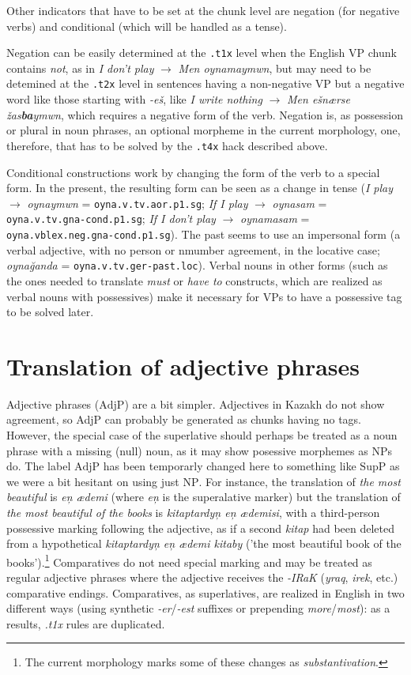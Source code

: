 \documentclass{article}
\begin{document}
Other indicators that have to be set at the chunk level are negation
(for negative verbs) and conditional (which will be handled as a
tense).

Negation can be easily determined at the \texttt{.t1x} level when the
English VP chunk contains \emph{not}, as in \emph{I don't play}
\(\to\) \emph{Men oynamaymwn}, but may need to be detemined at the
\texttt{.t2x} level in sentences having a non-negative VP but a
negative word like those starting with \emph{-eš}, like \emph{I write
  nothing} \(\to\) \emph{Men ešnærse \v{z}as\textbf{ba}ymwn}, which
requires a negative form of the verb. Negation is, as possession or
plural in noun phrases, an optional morpheme in the current
morphology, one, therefore, that has to be solved by the \texttt{.t4x}
hack described above.

Conditional constructions work by changing the form of the verb to a
special form. In the present, the resulting form can be seen as a
change in tense (\emph{I play} \(\to\) \emph{oynaymwn} =
\texttt{oyna.v.tv.aor.p1.sg}; \emph{If I play} \(\to\) \emph{oynasam}
= \texttt{oyna.v.tv.gna-cond.p1.sg}; \emph{If I don't play} \(\to\)
\emph{oynamasam} = \texttt{oyna.vblex.neg.gna-cond.p1.sg}). The past
seems to use an impersonal form (a verbal adjective, with no person or
nmumber agreement, in the locative case; \emph{oyna\u{g}anda} =
\texttt{oyna.v.tv.ger-past.loc}). Verbal nouns in other forms (such as
the ones needed to translate \emph{must} or \emph{have to} constructs,
which are realized as verbal nouns with possessives) make it necessary
for VPs to have a possessive tag to be solved later.

\section{Translation of adjective phrases}

Adjective phrases (\(\mathrm{AdjP}\)) are a bit simpler. Adjectives in
Kazakh do not show agreement, so AdjP can probably be generated as
chunks having no tags. However, the special case of the superlative
should perhaps be treated as a noun phrase with a missing (null) noun,
as it may show posessive morphemes as NPs do. The label \(\mathrm{AdjP}\)
has been temporarly changed here to something like \(\mathrm{SupP}\) as we were a bit hesitant on using just \(\mathrm{NP}\). For instance, the
translation of \emph{the most beautiful} is \emph{e\c{n} ædemi} (where
\emph{e\c{n}} is the superalative marker) but the translation of
\emph{the most beautiful of the books} is \emph{kitaptardy\c{n} e\c{n}
  ædemisi}, with a third-person possessive marking following the
adjective, as if a second \emph{kitap} had been deleted from a hypothetical \emph{kitaptardy\c{n} e\c{n} ædemi kitaby} ('the most
beautiful book of the books').\footnote{The current morphology marks
  some of these changes as \emph{substantivation}.} Comparatives do
not need special marking and may be treated as regular adjective
phrases where the adjective receives the \emph{-IRaK} (\emph{yraq}, \emph{irek}, etc.) comparative endings. Comparatives, as superlatives, are realized in English in two different ways (using synthetic \emph{-er}/\emph{-est} suffixes or prepending \emph{more}/\emph{most}): as a results, \emph{.t1x} rules are duplicated.
\end{document}

